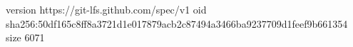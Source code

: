 version https://git-lfs.github.com/spec/v1
oid sha256:50df165c8ff8a3721d1e017879acb2c87494a3466ba9237709d1feef9b661354
size 6071
